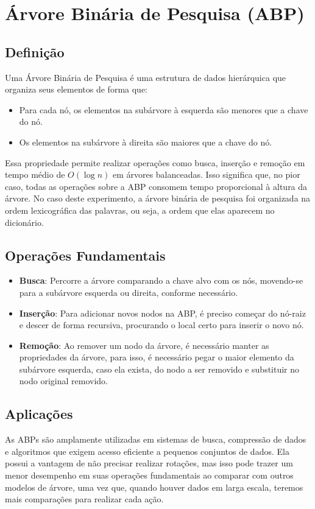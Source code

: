 \documentclass[a4paper, 12pt, english]{article}
\begin{document}
\section{Árvore Binária de Pesquisa (ABP)}
\subsection{Definição}
Uma Árvore Binária de Pesquisa é uma estrutura de dados hierárquica que organiza seus elementos de forma que:
\begin{itemize}
    \item Para cada nó, os elementos na subárvore à esquerda são menores que a chave do nó.
    \item Os elementos na subárvore à direita são maiores que a chave do nó.
\end{itemize}
Essa propriedade permite realizar operações como busca, inserção e remoção em tempo médio de $O(\log n)$ em árvores balanceadas. Isso significa que, no pior caso, todas as operações sobre a ABP consomem tempo proporcional à altura da árvore.
No caso deste experimento, a árvore binária de pesquisa foi organizada na ordem lexicográfica das palavras, ou seja, a ordem que elas aparecem no dicionário.

\subsection{Operações Fundamentais}
\begin{itemize}
    \item \textbf{Busca}: Percorre a árvore comparando a chave alvo com os nós, movendo-se para a subárvore esquerda ou direita, conforme necessário.
    \item \textbf{Inserção}: Para adicionar novos nodos na ABP, é preciso começar do nó-raiz e descer de forma recursiva, procurando o local certo para inserir o novo nó.
    \item \textbf{Remoção}: Ao remover um nodo da árvore, é necessário manter as propriedades da árvore, para isso, é necessário pegar o maior elemento da subárvore esquerda, caso ela exista, do nodo a ser removido e substituir no nodo original removido.

\end{itemize}

\subsection{Aplicações}
As ABPs são amplamente utilizadas em sistemas de busca, compressão de dados e algoritmos que exigem acesso eficiente a pequenos conjuntos de dados. Ela possui a vantagem de não precisar realizar rotações, mas isso pode trazer um menor desempenho em suas operações fundamentais ao comparar com outros modelos de árvore, uma vez que, quando houver dados em larga escala, teremos mais comparações para realizar cada ação.
\end{document}
